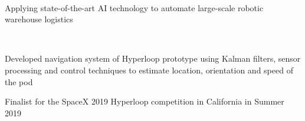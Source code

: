 \documentclass[]{lukas-cv-openfont}
\begin{document}
\noindent
{}
\\
\begin{tightitemize}{1.7em}
    \item Applying state-of-the-art AI technology to automate large-scale robotic warehouse logistics
\end{tightitemize}
\largesectionsep

\noindent
{}
\\
\begin{tightitemize}{1.7em}
    \item Developed navigation system of Hyperloop prototype using Kalman filters, sensor processing and control techniques to estimate location, orientation and speed of the pod
    \item Finalist for the SpaceX 2019 Hyperloop competition in California in Summer 2019
\end{tightitemize}
\end{document}
